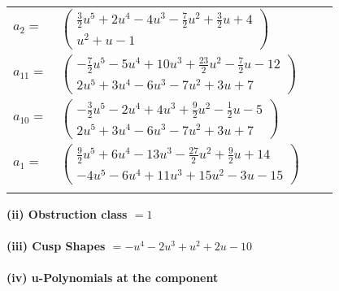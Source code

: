 \documentclass[1p]{elsarticle_modified}
\theoremstyle{definition}
\begin{document}
\begin{tabular}{m{7pt} m{180pt} m{7pt} m{180pt} }
\flushright $a_{2}=$&$\begin{pmatrix}\frac{3}{2} u^5+2 u^4-4 u^3-\frac{7}{2} u^2+\frac{3}{2} u+4\\u^2+u-1\end{pmatrix}$ \\
\flushright $a_{11}=$&$\begin{pmatrix}-\frac{7}{2} u^5-5 u^4+10 u^3+\frac{23}{2} u^2-\frac{7}{2} u-12\\2 u^5+3 u^4-6 u^3-7 u^2+3 u+7\end{pmatrix}$ \\
\flushright $a_{10}=$&$\begin{pmatrix}-\frac{3}{2} u^5-2 u^4+4 u^3+\frac{9}{2} u^2-\frac{1}{2} u-5\\2 u^5+3 u^4-6 u^3-7 u^2+3 u+7\end{pmatrix}$ \\
\flushright $a_{1}=$&$\begin{pmatrix}\frac{9}{2} u^5+6 u^4-13 u^3-\frac{27}{2} u^2+\frac{9}{2} u+14\\-4 u^5-6 u^4+11 u^3+15 u^2-3 u-15\end{pmatrix}$\\&\end{tabular}
\flushleft \textbf{(ii) Obstruction class $= 1$}\\~\\
\flushleft \textbf{(iii) Cusp Shapes $= - u^4-2 u^3+u^2+2 u-10$}\\~\\
\newpage\renewcommand{\arraystretch}{1}
\flushleft \textbf{(iv) u-Polynomials at the component}\newline \\
\end{document}
